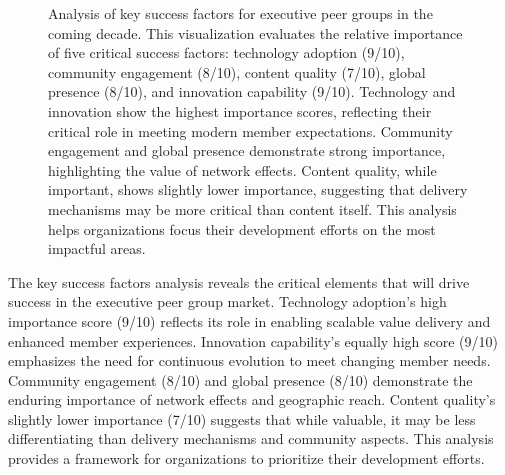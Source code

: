 \documentclass[conference]{IEEEtran}
\begin{document}
\begin{figure}[t]
\centering
{}
\caption{Analysis of key success factors for executive peer groups in the coming decade. This visualization evaluates the relative importance of five critical success factors: technology adoption (9/10), community engagement (8/10), content quality (7/10), global presence (8/10), and innovation capability (9/10). Technology and innovation show the highest importance scores, reflecting their critical role in meeting modern member expectations. Community engagement and global presence demonstrate strong importance, highlighting the value of network effects. Content quality, while important, shows slightly lower importance, suggesting that delivery mechanisms may be more critical than content itself. This analysis helps organizations focus their development efforts on the most impactful areas.}
\label{fig:success_factors}
\end{figure}

The key success factors analysis reveals the critical elements that will drive success in the executive peer group market. Technology adoption's high importance score (9/10) reflects its role in enabling scalable value delivery and enhanced member experiences. Innovation capability's equally high score (9/10) emphasizes the need for continuous evolution to meet changing member needs. Community engagement (8/10) and global presence (8/10) demonstrate the enduring importance of network effects and geographic reach. Content quality's slightly lower importance (7/10) suggests that while valuable, it may be less differentiating than delivery mechanisms and community aspects. This analysis provides a framework for organizations to prioritize their development efforts.
\end{document}
